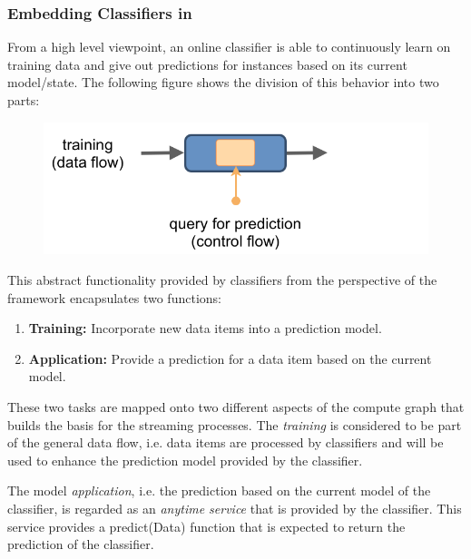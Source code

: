\subsubsection{\label{sec:streamsClassifiers}Embedding Classifiers in \streams}
From a high level viewpoint, an online classifier is able to
continuously learn on training data and give out predictions for
instances based on its current model/state. The following figure%
shows the division of this behavior into two parts:
\begin{figure}[h!]
  \centering
  \includegraphics[scale=0.35]{graphics/online-learning.png}
\end{figure}

\vspace{-2ex}
This abstract functionality provided by classifiers from the
perspective of the \streams framework encapsulates two functions:
\begin{enumerate}
\item {\bf Training:} Incorporate new data items into a prediction
  model.
\item {\bf Application:} Provide a prediction for a data item based on
  the current model.
\end{enumerate}
These two tasks are mapped onto two different aspects of the compute
graph that builds the basis for the streaming processes. The {\em
  training} is considered to be part of the general data flow,
i.e. data items are processed by classifiers and will be used to
enhance the prediction model provided by the classifier.

The model {\em application}, i.e. the prediction based on the current
model of the classifier, is regarded as an {\em anytime service} that
is provided by the classifier. This service provides a {\ttfamily
  predict(Data)} function that is expected to return the prediction of
the classifier.

